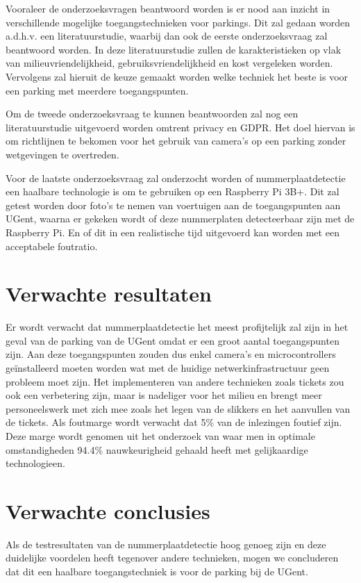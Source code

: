 Vooraleer de onderzoeksvragen beantwoord worden is er nood aan inzicht in verschillende mogelijke toegangstechnieken voor parkings. Dit zal gedaan worden a.d.h.v. een literatuurstudie, waarbij dan ook de eerste onderzoeksvraag zal beantwoord worden. In deze literatuurstudie zullen de karakteristieken op vlak van milieuvriendelijkheid, gebruiksvriendelijkheid en kost vergeleken worden. Vervolgens zal hieruit de keuze gemaakt worden welke techniek het beste is voor een parking met meerdere toegangspunten.

Om de tweede onderzoeksvraag te kunnen beantwoorden zal nog een literatuurstudie uitgevoerd worden omtrent privacy en GDPR. Het doel hiervan is om richtlijnen te bekomen voor het gebruik van camera’s op een parking zonder wetgevingen te overtreden.

Voor de laatste onderzoeksvraag zal onderzocht worden of nummerplaatdetectie een haalbare technologie is om te gebruiken op een Raspberry Pi 3B+. Dit zal getest worden door foto’s te nemen van voertuigen aan de toegangspunten aan UGent, waarna er gekeken wordt of deze nummerplaten detecteerbaar zijn met de Raspberry Pi. En of dit in een realistische tijd uitgevoerd kan worden met een acceptabele foutratio.

\section{Verwachte resultaten}
\label{sec:verwachte_resultaten}
Er wordt verwacht dat nummerplaatdetectie het meest profijtelijk zal zijn in het geval van de parking van de UGent omdat er een groot aantal toegangspunten zijn. Aan deze toegangspunten zouden dus enkel camera’s en microcontrollers geïnstalleerd moeten worden wat met de huidige netwerkinfrastructuur geen probleem moet zijn. Het implementeren van andere technieken zoals tickets zou ook een verbetering zijn, maar is nadeliger voor het milieu en brengt meer personeelswerk met zich mee zoals het legen van de slikkers en het aanvullen van de tickets. Als foutmarge wordt verwacht dat 5\% van de inlezingen foutief zijn. Deze marge wordt genomen uit het onderzoek van \textcite{figuerola2016automated} waar men in optimale omstandigheden 94.4\% nauwkeurigheid gehaald heeft met gelijkaardige technologieen.

\section{Verwachte conclusies}
\label{sec:verwachte_conclusies}

Als de testresultaten van de nummerplaatdetectie hoog genoeg zijn en deze duidelijke voordelen heeft tegenover andere technieken, mogen we concluderen dat dit een haalbare toegangstechniek is voor de parking bij de UGent.